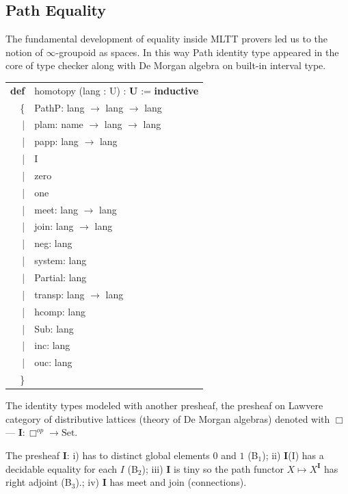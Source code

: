 \documentclass[a4paper,UKenglish,cleveref, autoref, thm-restate]{lipics-v2021}
\newcommand{\tabstyle}[0]{\scriptsize\ttfamily\fontseries{l}\selectfont}
\begin{document}
\newpage
\subsection{Path Equality}

The fundamental development of equality inside MLTT provers led us to the
notion of $\infty$-groupoid as spaces. In this way Path identity type appeared
in the core of type checker along with De Morgan algebra on built-in interval type.

\begin{table}[ht!]
\tabstyle
\begin{tabular}{rl}
     \textbf{def} & homotopy (lang : U) : \textbf{U} := \textbf{inductive} \\
               \{ & PathP: lang $\rightarrow$ lang $\rightarrow$ lang \\
  |& plam: name $\rightarrow$ lang $\rightarrow$ lang \\
  |& papp: lang $\rightarrow$ lang \\
  |& I \\
  |& zero \\
  |& one \\
  |& meet: lang $\rightarrow$ lang \\
  |& join: lang $\rightarrow$ lang \\
  |& neg: lang \\
  |& system: lang \\
  |& Partial: lang \\
  |& transp: lang $\rightarrow$ lang \\
  |& hcomp: lang \\
  |& Sub: lang \\
  |& inc: lang \\
  |& ouc: lang \\
 \}& \\
\end{tabular}
\end{table}

\begin{definition}
The identity types modeled with another presheaf, the presheaf on Lawvere
category of distributive lattices (theory of De Morgan algebras) denoted
with $\Box$ — $\textbf{I} : \Box^{op} \rightarrow \textrm{Set}$.
\end{definition}

\begin{definition} The presheaf $\textbf{I}$:
i) has to distinct global elements $0$ and $1$ (B$_1$);
ii) $\textbf{I}$(I) has a decidable equality for each $I$ (B$_2$);
iii) $\textbf{I}$ is tiny so the path functor $X \mapsto X^\textbf{I}$ has right adjoint (B$_3$).;
iv) $\textbf{I}$ has meet and join (connections).
\end{definition}
\end{document}
